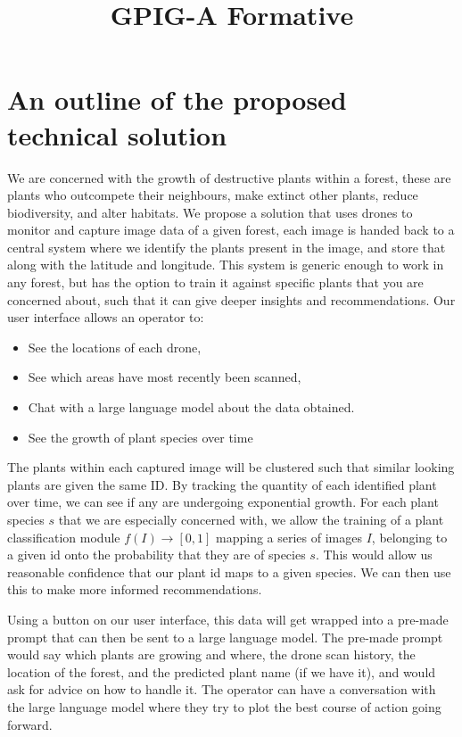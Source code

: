 \documentclass{article}
\title{GPIG-A Formative}
\begin{document}
\maketitle

\section{An outline of the proposed technical solution}

We are concerned with the growth of destructive plants within a forest, these are plants who outcompete their neighbours, make extinct other plants, reduce biodiversity, and alter habitats. 
We propose a solution that uses drones to monitor and capture image data of a given forest, each image is handed back to a central system where we identify the plants present in the image, and store that along with the latitude and longitude.
This system is generic enough to work in any forest, but has the option to train it against specific plants that you are concerned about, such that it can give deeper insights and recommendations.
Our user interface allows an operator to:
\begin{itemize}[noitemsep,topsep=3pt]
\item See the locations of each drone,
\item See which areas have most recently been scanned,
\item Chat with a large language model about the data obtained.
\item See the growth of plant species over time
\end{itemize}


The plants within each captured image will be clustered such that similar looking plants are given the same ID. 
By tracking the quantity of each identified plant over time, we can see if any are undergoing exponential growth.
For each plant species $s$ that we are especially concerned with, we allow the training of a plant classification module $f(I) \rightarrow [0,1]$ mapping a series of images $I$, belonging to a given id onto the probability that they are of species $s$. 
This would allow us reasonable confidence that our plant id maps to a given species.
We can then use this to make more informed recommendations.

Using a button on our user interface, this data will get wrapped into a pre-made prompt that can then be sent to a large language model.
The pre-made prompt would say which plants are growing and where, the drone scan history, the location of the forest, and the predicted plant name (if we have it), and would ask for advice on how to handle it.
The operator can have a conversation with the large language model where they try to plot the best course of action going forward.
\end{document}

